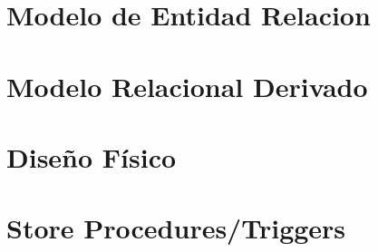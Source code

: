 \documentclass[a4paper,11pt]{article}
\begin{document}


\newpage

\tableofcontents


\newpage


\section{Modelo de Entidad Relacion}



\newpage

\section{Modelo Relacional Derivado}



\newpage

\section{Dise\~{n}o F\'isico}



\newpage

\section{Store Procedures/Triggers}



\newpage
\end{document}
